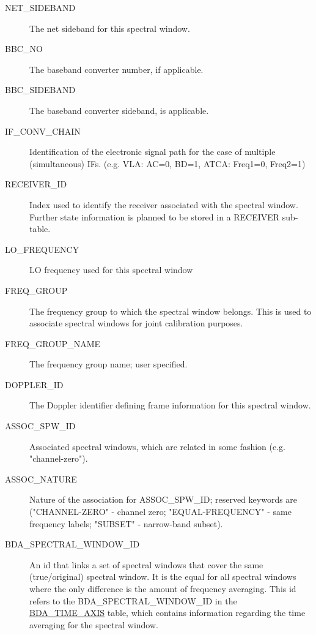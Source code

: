 \documentclass{article}
\begin{document}
\begin{description}
\item[NET\_SIDEBAND] The net sideband for this spectral window.

\item[BBC\_NO] The baseband converter number, if applicable.

\item[BBC\_SIDEBAND] The baseband converter sideband, is applicable.

\item[IF\_CONV\_CHAIN] Identification of the electronic signal
path for the case of multiple (simultaneous) IFs. (e.g. VLA: AC=0,
BD=1, ATCA: Freq1=0, Freq2=1)

\item[RECEIVER\_ID] Index used to identify the receiver associated
with the spectral window. Further state information is planned to be
stored in a RECEIVER sub-table.

\item[LO\_FREQUENCY] LO frequency used for this spectral window

\item[FREQ\_GROUP] The frequency group to which the spectral window belongs.
This is used to associate spectral windows for joint calibration purposes.

\item[FREQ\_GROUP\_NAME] The frequency group name; user specified.

\item[DOPPLER\_ID] The Doppler identifier defining frame information
for this spectral window.

\item[ASSOC\_SPW\_ID] Associated spectral windows, which are related
in some fashion (e.g. "channel-zero").

\item[ASSOC\_NATURE] Nature of the association for ASSOC\_SPW\_ID;
reserved keywords are ("CHANNEL-ZERO" - channel zero;
"EQUAL-FREQUENCY" - same frequency labels; "SUBSET" - narrow-band
subset).

\item[BDA\_SPECTRAL\_WINDOW\_ID] An id that links a set of spectral windows
that cover the same (true/original) spectral window. It is the equal for all
spectral windows where the only difference is the amount of frequency averaging.
This id refers to the BDA\_SPECTRAL\_WINDOW\_ID in the
\hyperref[tbl:bda-time-axis]{BDA\_TIME\_AXIS} table,
which contains information regarding the time averaging for the spectral window.

\end{description}
\end{document}
